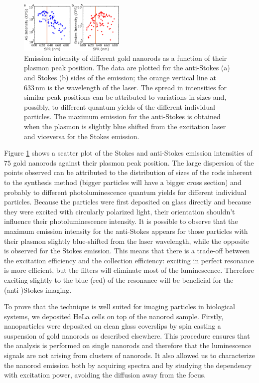 \documentclass[journal=nalefd,manuscript=letter]{achemso}
\newcommand{\nm}{\ensuremath{\,\textrm{nm}}}
\begin{document}
\begin{figure}[htp] \centering
\includegraphics[width=0.45\textwidth]{Figures/03_Intensity_SPR/Intensity_SPR.png}
\caption{Emission intensity of different gold nanorods as a function of their
plasmon peak position. The data are plotted for the anti-Stokes (a) and Stokes
(b) sides of the emission; the orange vertical line at $633\nm$ is the
wavelength of the laser. The spread in intensities for similar peak positions
can be attributed to variations in sizes and, possibly, to different quantum yields of the different individual particles. The maximum emission for the anti-Stokes
is obtained when the plasmon is slightly blue shifted from the excitation laser
and viceversa for the Stokes emission.}
	\label{fig:emission_peak_position}
\end{figure} 

Figure \ref{fig:emission_peak_position} shows a scatter plot of the Stokes and
anti-Stokes emission intensities of $75$ gold nanorods against their plasmon
peak position. The large dispersion of the points observed can be attributed to
the distribution of sizes of the rods inherent to the synthesis
method\cite{Zijlstra2011} (bigger particles will have a bigger cross section)
and probably to different photoluminescence quantum yields for different
individual particles. Because the particles were first deposited on glass
directly and because they were excited with circularly polarized light, their
orientation shouldn't influence their photoluminescence intensity. It is
possible to observe that the maximum emission intensity for the anti-Stokes
appears for those particles with their plasmon slightly blue-shifted from the
laser wavelength, while the opposite is observed for the Stokes emission. This
means that there is a trade-off between the excitation efficiency and the
collection efficiency: exciting in perfect resonance is more efficient, but the
filters will eliminate most of the luminescence. Therefore exciting slightly to
the blue (red) of the resonance will be beneficial for the (anti-)Stokes
imaging.

To prove that the technique is well suited for imaging particles in
biological systems, we deposited HeLa cells on top of the nanorod sample.
Firstly, nanoparticles were deposited on clean glass coverslips by spin casting
a suspension of gold nanorods as described elsewhere\cite{Zijlstra2011}. This
procedure ensures that the analysis is performed on single nanorods and
therefore that the luminescence signals are not arising from clusters of
nanorods. It also allowed us to characterize the nanorod emission both by
acquiring spectra and by studying the dependency with excitation power, avoiding
the diffusion away from the focus.
\end{document}
